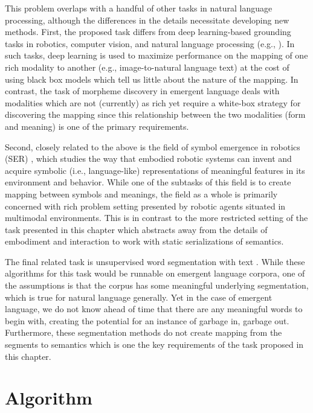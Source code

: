 This problem overlaps with a handful of other tasks in natural language processing, although the differences in the details necessitate developing new methods.
First, the proposed task differs from deep learning-based grounding tasks in robotics, computer vision, and natural language processing (e.g., \citet{Yeh_2018_CVPR,jiang-etal-2019-tiger}).
In such tasks, deep learning is used to maximize performance on the mapping of one rich modality to another (e.g., image-to-natural language text) at the cost of using black box models which tell us little about the nature of the mapping.
In contrast, the task of morpheme discovery in emergent language deals with modalities which are not (currently) as rich yet require a white-box strategy for discovering the mapping since this relationship between the two modalities (form and meaning) is one of the primary requirements.

Second, closely related to the above is the field of symbol emergence in robotics (SER) \citep{Taniguchi17062016}, which studies the way that embodied robotic systems can invent and acquire symbolic (i.e., language-like) representations of meaningful features in its environment and behavior.
While one of the subtasks of this field is to create mapping between symbols and meanings, the field as a whole is primarily concerned with rich problem setting presented by robotic agents situated in multimodal environments.
This is in contrast to the more restricted setting of the task presented in this chapter which abstracts away from the details of embodiment and interaction to work with static serializations of semantics.

The final related task is unsupervised word segmentation with text \citep{brent1999efficient,goldwater-etal-2006-contextual,mochihashi-etal-2009-bayesian}.
While these algorithms for this task would be runnable on emergent language corpora, one of the assumptions is that the corpus has some meaningful underlying segmentation, which is true for natural language generally.
Yet in the case of emergent language, we do not know ahead of time that there are any meaningful words to begin with, creating the potential for an instance of garbage in, garbage out.
Furthermore, these segmentation methods do not create mapping from the segments to semantics which is one the key requirements of the task proposed in this chapter.


\section{Algorithm}
\unskip\label{morph:sec:algorithm}

